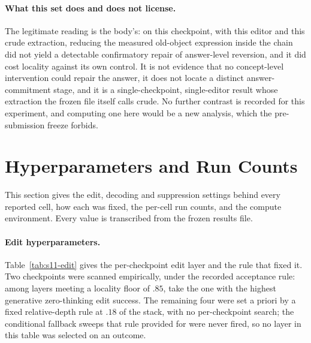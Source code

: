 \documentclass[letterpaper]{article}
\begin{document}
\paragraph{What this set does and does not license.}
The legitimate reading is the body's: on this checkpoint, with this editor and
this crude extraction, reducing the measured old-object expression inside the
chain did not yield a detectable confirmatory repair of answer-level reversion,
and it did cost locality against its own control.  It is not evidence that no
concept-level intervention could repair the answer, it does not locate a distinct
answer-commitment stage, and it is a single-checkpoint, single-editor result
whose extraction the frozen file itself calls crude.  No further contrast is
recorded for this experiment, and computing one here would be a new analysis,
which the pre-submission freeze forbids.

\section{Hyperparameters and Run Counts}
This section gives the edit, decoding and suppression settings behind every
reported cell, how each was fixed, the per-cell run counts, and the compute
environment.  Every value is transcribed from the frozen results file.

\paragraph{Edit hyperparameters.}
Table~\ref{tab:s11-edit} gives the per-checkpoint edit layer and the rule that
fixed it.  Two checkpoints were scanned empirically, under the recorded acceptance rule:
among layers meeting a locality floor of \(.85\), take the one with the highest
generative zero-thinking edit success.  The remaining
four were set a priori by a fixed relative-depth rule at \(.18\) of the stack,
with no per-checkpoint search; the conditional fallback sweeps that rule provided
for were never fired, so no layer in this table was selected on an outcome.
\end{document}
